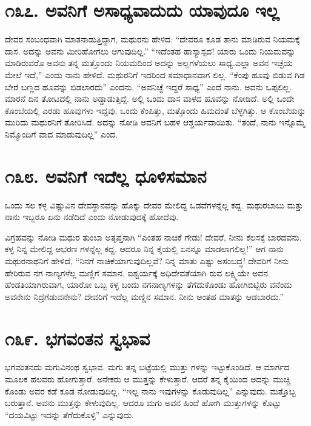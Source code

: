 \section{\num{೧೩೭. } ಅವನಿಗೆ ಅಸಾಧ್ಯವಾದುದು ಯಾವುದೂ ಇಲ್ಲ}

ದೇವರ ಸಂಬಂಧವಾಗಿ ಮಾತನಾಡುತ್ತಿದ್ದಾಗ, ಮಥುರನು ಹೇಳಿದ: “ದೇವರೂ ಕೂಡ ತಾನು ಮಾಡಿರುವ ನಿಯಮಕ್ಕೆ ದಾಸ. ಅದನ್ನು ಅವನು ಮೀರಿಹೋಗಲು ಆಗುವುದಿಲ್ಲ.” “ಇದೆಂತಹ ಹಾಸ್ಯಾಸ್ಪದ! ಯಾರು ಒಂದು ನಿಯಮವನ್ನು ಮಾಡಿರುವರೊ ಅವನು ತನ್ನ ಮತ್ತೊಂದು ನಿಯಮದಿಂದ ಅದನ್ನು ಅಲ್ಲಗಳೆಯಲು ಸಾಧ್ಯ.ಎಲ್ಲಾ ಅವನ ಇಚ್ಛೆಯ ಮೇಲೆ ಇದೆ,” ಎಂದು ನಾನು ಹೇಳಿದೆ. ಮಥುರನಿಗೆ ಇದರಿಂದ ಸಮಾಧಾನವಾಗ ಲಿಲ್ಲ. “ಕೆಂಪು ಹೂವು ಬಿಡುವ ಗಿಡ ಬೇರೆ ಬಣ್ಣದ ಹೂವನ್ನು ಬಿಡಲಾರದು” ಎಂದನು. “ಅವನಿಚ್ಛೆ ಇದ್ದರೆ ಸಾಧ್ಯ” ಎಂದೆ ನಾನು. ಅವನು ಒಪ್ಪಲಿಲ್ಲ. ಮಾರನೆ ದಿನ ತೋಟದಲ್ಲಿ ನಾನು ಅಡ್ಡಾಡುತ್ತಿದ್ದೆ. ಅಲ್ಲಿ ಒಂದು ದಾಸ ವಾಳದ ಹೂವನ್ನು ನೋಡಿದೆ. ಅಲ್ಲಿ ಒಂದೇ ಕೊಂಬೆಯಲ್ಲಿ ಎರಡು ಹೂವುಗಳು ಇದ್ದವು. ಒಂದು ಕೆಂಪಿತ್ತು, ಮತ್ತೊಂದು ಹಿಮದಂತೆ ಬೆಳ್ಳಗಿತ್ತು. ಆ ಕೊಂಬೆಯನ್ನು ಮುರಿದು ಮಥುರನಿಗೆ ತೋರಿಸಿದೆ. ಅದನ್ನು ನೋಡಿ ಅವನಿಗೆ ಬಹಳ ಆಶ್ಚರ್ಯವಾಯಿತು. “ತಂದೆ, ನಾನು ಇನ್ನೊಮ್ಮೆ ನಿಮ್ಮೊಂದಿಗೆ ವಾದ ಮಾಡುವುದಿಲ್ಲ” ಎಂದ.



\section{\num{೧೩೮. } ಅವನಿಗೆ ಇದೆಲ್ಲ ಧೂಳಿಸಮಾನ}

ಒಂದು ಸಲ ಕಳ್ಳ ವಿಷ್ಣುವಿನ ದೇವಸ್ಥಾನವನ್ನು ಹೊಕ್ಕು ದೇವರ ಮೇಲಿದ್ದ ಒಡವೆಗಳನ್ನೆಲ್ಲ ಕದ್ದ. ಮಥುರಬಾಬು ಮತ್ತು ನಾನು ಇಬ್ಬರೂ ಏನು ನಡೆದಿದೆ ಎಂದು ನೋಡುವುದಕ್ಕೆ ಹೋದೆವು.

ವಿಗ್ರಹವನ್ನು ನೋಡಿ ಮಥುರ ತುಂಬಾ ಅತೃಪ್ತನಾಗಿ “ಎಂತಹ ನಾಚಿಕೆ ಗೇಡು! ದೇವರೆ, ನೀನು ಕೆಲಸಕ್ಕೆ ಬಾರದವನು. ಕಳ್ಳ ನಿನ್ನ ಮೇಲಿದ್ದ ಆಭರಣ ಗಳನ್ನೆಲ್ಲ ಕದ್ದ. ಆದರೂ ನಿನ್ನ ಕೈಯಲ್ಲಿ ಏನನ್ನೂ ಮಾಡಲಾಗಲಿಲ್ಲ!” ಆಗ ನಾನು ಮಥುರನಾಥನಿಗೆ ಹೇಳಿದೆ, “ನಿನಗೆ ನಾಚಿಕೆಯಾಗುವುದಿಲ್ಲವೆ? ನಿನ್ನ ಮಾತು ಎಷ್ಟು ಅಸಂಬದ್ಧ! ದೇವರಿಗೆ ನೀನು ಹೇರಿರುವ ನಗ ನಾಣ್ಯಗಳೆಲ್ಲ ಮಣ್ಣಿಗೆ ಸಮಾನ. ಐಶ್ವರ್ಯಕ್ಕೆ ಅಧಿದೇವತೆಯಾಗಿ ರುವ ಲಕ್ಷ್ಮಿಯೇ ಅವನ ಹೆಂಡತಿಯಾಗಿರುವಾಗ, ಯಾರೋ ಒಬ್ಬ ಕಳ್ಳ ಬಂದು ನಗನಾಣ್ಯಗಳನ್ನು ತೆಗೆದುಕೊಂಡು ಹೋಗಿಬಿಟ್ಟಿರು ವನೆಂದು ಅವನೇನು ನಿದ್ರೆಗೆಡುವನೇನು? ದೇವರಿಗೆ ಇದೆಲ್ಲ ಮಣ್ಣಿನ ಸಮಾನ. ನೀನು ಅಂತಹ ಮಾತನ್ನು ಆಡಬಾರದು.”


\section{\num{೧೩೯. } ಭಗವಂತನ ಸ್ವಭಾವ}

ಭಗವಂತನದು ಮಗುವಿನಂಥ ಸ್ವಭಾವ. ಮಗು ತನ್ನ ಬಟ್ಟೆಯಲ್ಲಿ ಮುತ್ತು ಗಳನ್ನು ಇಟ್ಟುಕೊಂಡಿದೆ. ಆ ಮಾರ್ಗದ ಮೂಲಕ ಹಲವರು ಹೋಗುತ್ತಾರೆ. ಅನೇಕರು ಆ ಮುತ್ತನ್ನು ಕೇಳುತ್ತಾರೆ. ಆದರೆ ತನ್ನ ಕೈಯಿಂದ ಅದನ್ನು ಮುಚ್ಚಿ ಕೊಂಡು ಅವರ ಕಡೆ ಕೂಡ ನೋಡುವುದಿಲ್ಲ. “ಇಲ್ಲ ನಾನು ಇವುಗಳನ್ನು ಕೊಡುವುದಿಲ್ಲ” ಎನ್ನುವುದು. ಮತ್ತೊಬ್ಬ ಬರುತ್ತಾನೆ. ಅವನು ಮುತ್ತನ್ನು ಕೇಳುವುದಿಲ್ಲ. ಆದರೂ ಮಗು ಅವನ ಹಿಂದೆ ಹೋಗಿ ಮುತ್ತುಗಳನ್ನು ಕೊಟ್ಟು “ದಯವಿಟ್ಟು ಇದನ್ನು ತೆಗೆದುಕೊಳ್ಳಿ” ಎನ್ನುವುದು.


